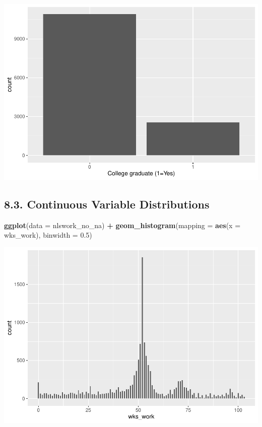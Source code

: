 \documentclass[
]{article}
\newenvironment{Shaded}{\begin{snugshade}}{\end{snugshade}}
\newcommand{\AttributeTok}[1]{\textcolor[rgb]{0.13,0.29,0.53}{#1}}
\newcommand{\FloatTok}[1]{\textcolor[rgb]{0.00,0.00,0.81}{#1}}
\newcommand{\FunctionTok}[1]{\textcolor[rgb]{0.13,0.29,0.53}{\textbf{#1}}}
\newcommand{\NormalTok}[1]{#1}
\newcommand{\SpecialCharTok}[1]{\textcolor[rgb]{0.81,0.36,0.00}{\textbf{#1}}}
\begin{document}
\includegraphics{RIntro_files/figure-latex/unnamed-chunk-19-1.pdf}

\hypertarget{continuous-variable-distributions}{%
\subsection{8.3. Continuous Variable
Distributions}\label{continuous-variable-distributions}}

\begin{Shaded}
\begin{Highlighting}[]
\FunctionTok{ggplot}\NormalTok{(}\AttributeTok{data =}\NormalTok{ nlswork\_no\_na) }\SpecialCharTok{+}
  \FunctionTok{geom\_histogram}\NormalTok{(}\AttributeTok{mapping =} \FunctionTok{aes}\NormalTok{(}\AttributeTok{x =}\NormalTok{ wks\_work), }\AttributeTok{binwidth =} \FloatTok{0.5}\NormalTok{)}
\end{Highlighting}
\end{Shaded}

\includegraphics{RIntro_files/figure-latex/unnamed-chunk-20-1.pdf}
\end{document}
